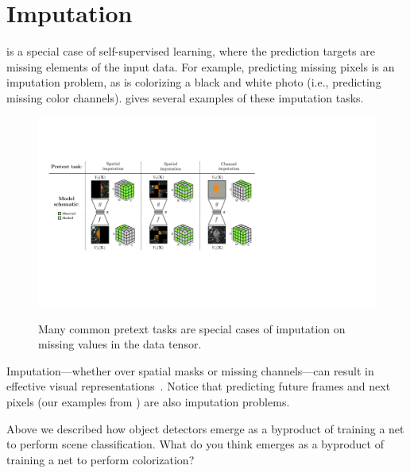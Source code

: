 \section{Imputation}
 is a special case of self-supervised learning, where the prediction targets are missing elements of the input data. For example, predicting missing pixels is an imputation problem, as is colorizing a black and white photo (i.e., predicting missing color channels). \Fig{\ref{fig:representation_learning:imputation_examples}} gives several examples of these imputation tasks.
\begin{figure}[h!]
    \centerline{
        \includegraphics[width=1.0\linewidth]{figures/representation_learning/imputation_examples.pdf}
        \label{fig:representation_learning:imputation_examples}
    }
    \caption{Many common pretext tasks are special cases of imputation on missing values in the data tensor.}
    \label{fig:representation_learning:imputation_examples}
    \vspace{-1.0em}
\end{figure}

Imputation—whether over spatial masks or missing channels—can result in effective visual representations~\cite{vincent2008extracting, pathak2016context,he2022masked,zhang2016colorful,larsson2016learning,zhang2017split}. Notice that predicting future frames and next pixels (our examples from \fig{\ref{fig:representation_learning:predictive_learning_examples}}) are also imputation problems.

Above we described how object detectors emerge as a byproduct of training a net to perform scene classification. What do you think emerges as a byproduct of training a net to perform colorization?

